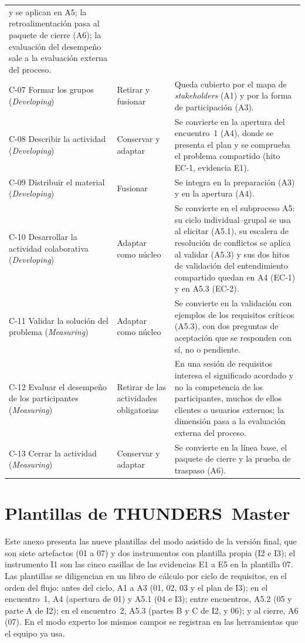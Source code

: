\documentclass[12pt,letterpaper,oneside]{report}
\begin{document}
{\begin{xltabular}{\textwidth}{@{}>{\raggedright\arraybackslash}p{0.25\textwidth}
                                >{\raggedright\arraybackslash}p{0.14\textwidth}
                                >{\raggedright\arraybackslash}X@{}}
  y se aplican en A5; la retroalimentación pasa al paquete de cierre (A6); la
  evaluación del desempeño sale a la evaluación externa del proceso. \\
C-07 Formar los grupos (\textit{Developing}) & Retirar y fusionar
& Queda cubierto por el mapa de \textit{stakeholders} (A1) y por la forma de
  participación (A3). \\
C-08 Describir la actividad (\textit{Developing}) & Conservar y adaptar
& Se convierte en la apertura del encuentro~1 (A4), donde se presenta el plan y
  se comprueba el problema compartido (hito EC-1, evidencia E1). \\
C-09 Distribuir el material (\textit{Developing}) & Fusionar
& Se integra en la preparación (A3) y en la apertura (A4). \\
C-10 Desarrollar la actividad colaborativa (\textit{Developing}) & Adaptar como núcleo
& Se convierte en el subproceso A5: su ciclo individual--grupal se usa al
  elicitar (A5.1), su escalera de resolución de conflictos se aplica al validar (A5.3) y sus
  dos hitos de validación del entendimiento compartido quedan en A4 (EC-1) y en A5.3
  (EC-2). \\
C-11 Validar la solución del problema (\textit{Measuring}) & Adaptar como núcleo
& Se convierte en la validación con ejemplos de los requisitos críticos (A5.3),
  con dos preguntas de aceptación que se responden con sí, no o pendiente. \\
C-12 Evaluar el desempeño de los participantes (\textit{Measuring}) & Retirar de
las actividades obligatorias
& En una sesión de requisitos interesa el significado acordado y no la
  competencia de los participantes, muchos de ellos clientes o usuarios
  externos; la dimensión pasa a la evaluación externa del proceso. \\
C-13 Cerrar la actividad (\textit{Measuring}) & Conservar y adaptar
& Se convierte en la línea base, el paquete de cierre y la prueba de traspaso
  (A6). \\
\end{xltabular}}

\chapter{Plantillas de THUNDERS~Master}
\label{anx:plantillas}
Este anexo presenta las nueve plantillas del modo asistido de la versión final,
que son siete artefactos (01 a 07) y dos instrumentos con plantilla propia (I2 e
I3); el instrumento I1 son las cinco casillas de las evidencias E1 a E5 en la
plantilla 07. Las plantillas se diligencian en un libro de cálculo por ciclo de
requisitos, en el orden del flujo: antes del ciclo, A1 a A3 (01, 02, 03 y el plan
de I3); en el encuentro~1, A4 (apertura de 01) y A5.1 (04 e I3); entre
encuentros, A5.2 (05 y parte A de I2); en el encuentro~2, A5.3 (partes B y C de
I2, y 06); y al cierre, A6 (07). En el modo experto los mismos campos se
registran en las herramientas que el equipo ya usa.
\end{document}
